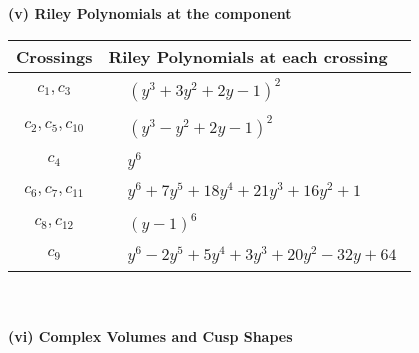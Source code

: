 \documentclass[1p]{elsarticle_modified}
\theoremstyle{definition}
\begin{document}
\newpage\renewcommand{\arraystretch}{1}
\flushleft \textbf{(v) Riley Polynomials at the component}\newline \\
\begin{tabular}{m{50pt}|m{274pt}}
Crossings & \hspace{64pt}Riley Polynomials at each crossing \\
\hline $$\begin{aligned}c_{1},c_{3}\end{aligned}$$&$\begin{aligned}
&(y^3+3 y^2+2 y-1)^2
\end{aligned}$\\
\hline $$\begin{aligned}c_{2},c_{5},c_{10}\end{aligned}$$&$\begin{aligned}
&(y^3- y^2+2 y-1)^2
\end{aligned}$\\
\hline $$\begin{aligned}c_{4}\end{aligned}$$&$\begin{aligned}
&y^6
\end{aligned}$\\
\hline $$\begin{aligned}c_{6},c_{7},c_{11}\end{aligned}$$&$\begin{aligned}
&y^6+7 y^5+18 y^4+21 y^3+16 y^2+1
\end{aligned}$\\
\hline $$\begin{aligned}c_{8},c_{12}\end{aligned}$$&$\begin{aligned}
&(y-1)^6
\end{aligned}$\\
\hline $$\begin{aligned}c_{9}\end{aligned}$$&$\begin{aligned}
&y^6-2 y^5+5 y^4+3 y^3+20 y^2-32 y+64
\end{aligned}$\\
\hline
\end{tabular}\\~\\
\newpage\flushleft \textbf{(vi) Complex Volumes and Cusp Shapes}
\end{document}
